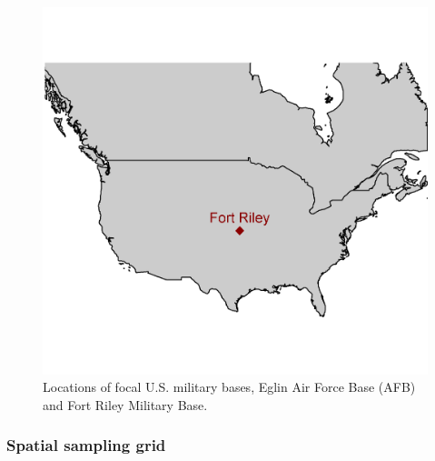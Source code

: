 \documentclass[12pt,twoside,openany]{reedthesis}
\begin{document}
\begin{figure}[h]

{\centering \includegraphics[width=0.85\linewidth]{./chapterFiles/fisherSpatial/figures/figsCalledInDiss/basesOfInterestMap} 

}

\caption{Locations of focal U.S. military bases, Eglin Air Force Base (AFB) and Fort Riley Military Base.}\label{fig:basesOfInterestMap}
\end{figure}
\hypertarget{spatial-sampling-grid}{%
\subsubsection{Spatial sampling grid}\label{spatial-sampling-grid}}
\end{document}
